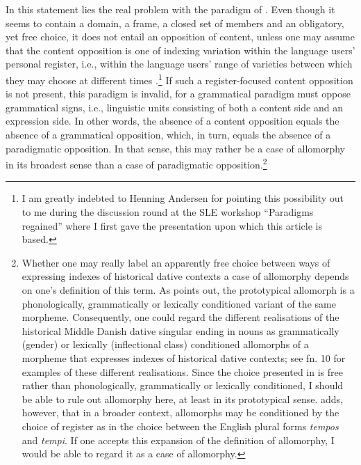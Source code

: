 \documentclass[output=paper]{langsci/langscibook}
\begin{document}
In this statement lies the real problem with the paradigm of . Even though it seems to contain a domain, a frame, a closed set of members and an obligatory, yet free choice, it does not entail an opposition of content, unless one may assume that the content opposition is one of indexing variation within the language users’ personal register, i.e., within the language users’ range of varieties between which they may choose at different times \citep[77]{Halliday1994}.\footnote{I am greatly indebted to Henning Andersen for pointing this possibility out to me during the discussion round at the SLE workshop “Paradigms regained” where I first gave the presentation upon which this article is based.} If such a register-focused content opposition is not present, this paradigm is invalid, for a grammatical paradigm must oppose grammatical signs, i.e., linguistic units consisting of both a content side and an expression side. In other words, the absence of a content opposition equals the absence of a grammatical opposition, which, in turn, equals the absence of a paradigmatic opposition. In that sense, this may rather be a case of allomorphy in its broadest sense than a case of paradigmatic\largerpage{} opposition.\footnote{Whether one may really label an apparently free choice between ways of expressing indexes of historical dative contexts a case of allomorphy depends on one's definition of this term. As \citet[17, 113–114]{Bauer2003} points out, the prototypical allomorph is a phonologically, grammatically or lexically conditioned variant of the same morpheme. Consequently, one could regard the different realisations of the historical Middle Danish dative singular ending in nouns as grammatically (gender) or lexically (inflectional class) conditioned allomorphs of a morpheme that expresses indexes of historical dative contexts; see fn. 10 for examples of these different realisations. Since the choice presented in  is free rather than phonologically, grammatically or lexically conditioned, I should be able to rule out allomorphy here, at least in its prototypical sense. \citet[113--114]{Bauer2003} adds, however, that in a broader context, allomorphs may be conditioned by the choice of register as in the choice between the English plural forms \textit{tempos} and \textit{tempi}. If one accepts this expansion of the definition of allomorphy, I would be able to regard it as a case of allomorphy.}
\end{document}
